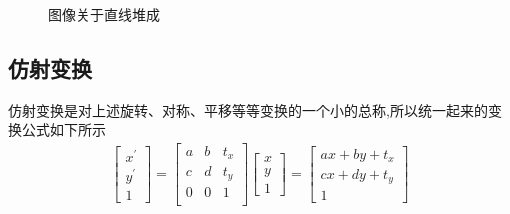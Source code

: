 \documentclass[UTF8,a4paper,10pt]{ctexart}
\begin{document}
\begin{flushleft}
\begin{itemize}
\begin{itemize}
\begin{figure}[htbp]
{                    }%
                    \caption{图像关于直线堆成}
                    \label{fig:fig_line}
                \end{figure}
            \end{itemize}
        \end{itemize}
        \subsection{仿射变换}
        \hspace{2em}仿射变换是对上述旋转、对称、平移等等变换的一个小的总称,所以统一起来的变换公式如下所示
        \begin{eqnarray}
            \left[\begin{array}{c}
                x^{\prime}\\
                y^{\prime}\\
                1
            \end{array}\right]=\left[\begin{array}{ccc}
                a & b & t_{x}\\
                c & d & t_{y}\\
                0 & 0 & 1\\
            \end{array}\right]\left[\begin{array}{c}
                x\\
                y\\
                1
            \end{array}\right]=\left[\begin{array}{c}
                ax+by+t_{x}\\
                cx+dy+t_{y}\\
                1
            \end{array}\right]\nonumber
        \end{eqnarray}

\end{flushleft}
\end{document}

